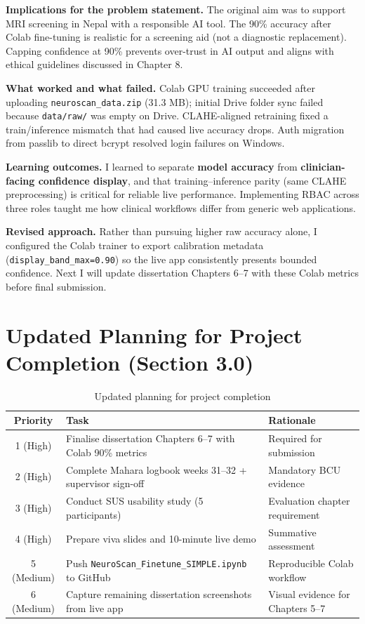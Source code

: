 \documentclass[11pt,a4paper]{article}
\begin{document}
\textbf{Implications for the problem statement.} The original aim was to support MRI screening in Nepal with a responsible AI tool. The 90\% accuracy after Colab fine-tuning is realistic for a screening aid (not a diagnostic replacement). Capping confidence at 90\% prevents over-trust in AI output and aligns with ethical guidelines discussed in Chapter 8.

\textbf{What worked and what failed.} Colab GPU training succeeded after uploading \texttt{neuroscan\_data.zip} (31.3 MB); initial Drive folder sync failed because \texttt{data/raw/} was empty on Drive. CLAHE-aligned retraining fixed a train/inference mismatch that had caused live accuracy drops. Auth migration from passlib to direct bcrypt resolved login failures on Windows.

\textbf{Learning outcomes.} I learned to separate \textbf{model accuracy} from \textbf{clinician-facing confidence display}, and that training--inference parity (same CLAHE preprocessing) is critical for reliable live performance. Implementing RBAC across three roles taught me how clinical workflows differ from generic web applications.

\textbf{Revised approach.} Rather than pursuing higher raw accuracy alone, I configured the Colab trainer to export calibration metadata (\texttt{display\_band\_max=0.90}) so the live app consistently presents bounded confidence. Next I will update dissertation Chapters 6--7 with these Colab metrics before final submission.

\section{Updated Planning for Project Completion (Section 3.0)}
\begin{table}[H]
\centering
\caption{Updated planning for project completion}
\label{tab:planning}
\small
\begin{tabularx}{\textwidth}{|c|l|X|}
\hline
\textbf{Priority} & \textbf{Task} & \textbf{Rationale} \\
\hline
1 (High)   & Finalise dissertation Chapters 6--7 with Colab 90\% metrics & Required for submission \\
\hline
2 (High)   & Complete Mahara logbook weeks 31--32 + supervisor sign-off     & Mandatory BCU evidence \\
\hline
3 (High)   & Conduct SUS usability study (5 participants)                   & Evaluation chapter requirement \\
\hline
4 (High)   & Prepare viva slides and 10-minute live demo                    & Summative assessment \\
\hline
5 (Medium) & Push \texttt{NeuroScan\_Finetune\_SIMPLE.ipynb} to GitHub      & Reproducible Colab workflow \\
\hline
6 (Medium) & Capture remaining dissertation screenshots from live app       & Visual evidence for Chapters 5--7 \\
\hline
\end{tabularx}
\end{table}
\end{document}
